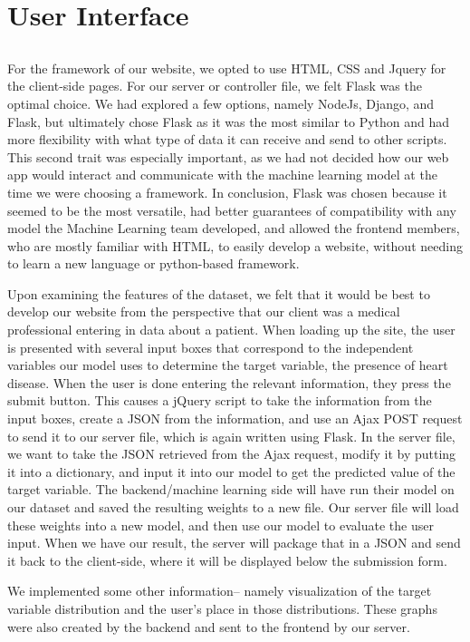 \documentclass[12pt]{article}
\begin{document}
\section*{User Interface}
\subsection*{}
\hspace{\parindent} For the framework of our website, we opted to use HTML, CSS and Jquery for the client-side pages. For our server or controller file, we felt Flask was the optimal choice. We had explored a few options, namely NodeJs, Django, and Flask, but ultimately chose Flask as it was the most similar to Python and had more flexibility with what type of data it can receive and send to other scripts. This second trait was especially important, as we had not decided how our web app would interact and communicate with the machine learning model at the time we were choosing a framework. In conclusion, Flask was chosen because it seemed to be the most versatile, had better guarantees of compatibility with any model the Machine Learning team developed, and allowed the frontend members, who are mostly familiar with HTML, to easily develop a website, without needing to learn a new language or python-based framework. 
	\par Upon examining the features of the dataset, we felt that it would be best to develop our website from the perspective that our client was a medical professional entering in data about a patient. When loading up the site, the user is presented with several input boxes that correspond to the independent variables our model uses to determine the target variable, the presence of heart disease. When the user is done entering the relevant information, they press the submit button. This causes a jQuery script to take the information from the input boxes, create a JSON from the information, and use an Ajax POST request to send it to our server file, which is again written using Flask. In the server file, we want to take the JSON retrieved from the Ajax request, modify it by putting it into a dictionary, and input it into our model to get the predicted value of the target variable. The backend/machine learning side will have run their model on our dataset and saved the resulting weights to a new file. Our server file will load these weights into a new model, and then use our model to evaluate the user input. When we have our result, the server will package that in a JSON and send it back to the client-side, where it will be displayed below the submission form.
	\par We implemented some other information-- namely visualization of the target variable distribution and the user's place in those distributions. These graphs were also created by the backend and sent to the frontend by our server.
\end{document}
